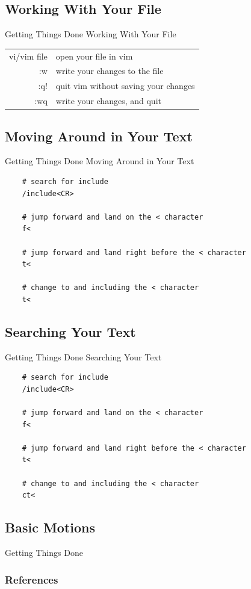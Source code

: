 \documentclass{beamer}
\begin{document}
\subsection{Working With Your File}
\begin{frame}[t]{Getting Things Done} {Working With Your File}
    \begin{table}[htpb]
        \centering
        \begin{tabular}{r|l}
            vi/vim file & open your file in vim \\
            :w & write your changes to the file \\
            :q! & quit vim without saving your changes \\
            :wq & write your changes, and quit \\
        \end{tabular}
    \end{table}
\end{frame}


\subsection{Moving Around in Your Text}
\begin{frame}[fragile]{Getting Things Done} {Moving Around in Your Text} 
    \begin{lstlisting}
    # search for include
    /include<CR>

    # jump forward and land on the < character
    f<

    # jump forward and land right before the < character
    t<

    # change to and including the < character
    t<
    \end{lstlisting}  
\end{frame}

\subsection{Searching Your Text}
\begin{frame}[fragile]{Getting Things Done} {Searching Your Text} 
    \begin{lstlisting}
    # search for include
    /include<CR>

    # jump forward and land on the < character
    f<

    # jump forward and land right before the < character
    t<

    # change to and including the < character
    ct<
    \end{lstlisting}  
\end{frame}





\subsection{Basic Motions}
\begin{frame}[t]{Getting Things Done}
    
\end{frame}





\begin{frame}
\frametitle{References}
\printbibliography
\end{frame}
\end{document}
